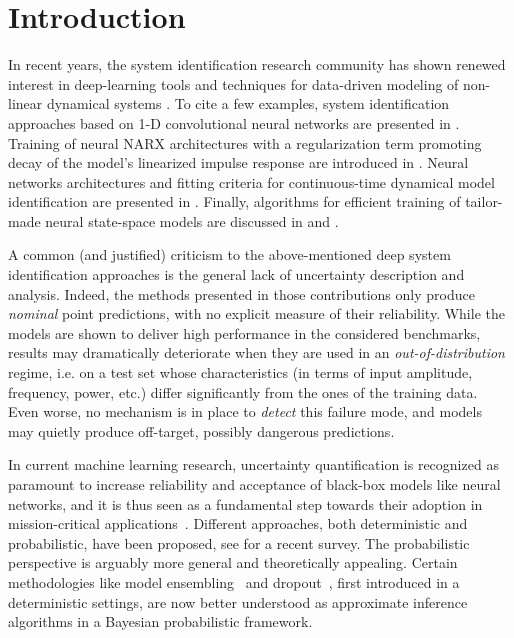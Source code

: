 \documentclass{ifacconf}
\begin{document}
\section{Introduction}
In recent years, the system identification research community has shown renewed interest in deep-learning tools and techniques for data-driven modeling of non-linear dynamical systems \citep{ljung2020deep}. %
To cite a few examples, system identification approaches based on 1-D convolutional neural networks are presented in \cite{andersson2019, wu2019deep}.
Training of neural NARX architectures with a regularization term promoting decay of the model's linearized impulse response are introduced in 
\cite{peeters2022narx}. Neural networks architectures and fitting criteria  for continuous-time dynamical model identification are presented in \cite{Mavkov20}. %
Finally, algorithms for efficient training of tailor-made neural state-space models are discussed in \cite{forgione2020model} and \cite{beintema2021nonlinear}. 

A common (and justified) criticism to the above-mentioned deep system identification approaches is the general lack of uncertainty description and analysis. Indeed, the methods presented in those contributions only produce \emph{nominal} point predictions, with no explicit measure of their reliability.
While the models are shown to deliver high performance in the considered benchmarks, results may dramatically deteriorate when they are used in an \emph{out-of-distribution} regime, i.e. on a test set whose characteristics (in terms of input amplitude, frequency, power, etc.) differ significantly from the ones of the training data. Even worse, no mechanism is in place to \emph{detect} this failure mode, and models may quietly produce off-target, possibly dangerous predictions.

In current machine learning research, uncertainty quantification is recognized as paramount to increase reliability and acceptance of black-box models like neural networks, and it is thus seen as a fundamental step towards their adoption in mission-critical
applications~\citep{loquercio2020general}. Different approaches, both deterministic and probabilistic, have been proposed, see \cite{gawlikowski2021survey} for a recent survey. The probabilistic perspective is arguably more general and theoretically appealing. Certain methodologies like model ensembling~\citep{lakshminarayanan2017simple} and dropout~\citep{srivastava2014dropout}, first introduced in a deterministic settings, are now better understood as approximate inference algorithms in a Bayesian probabilistic framework.
\end{document}
